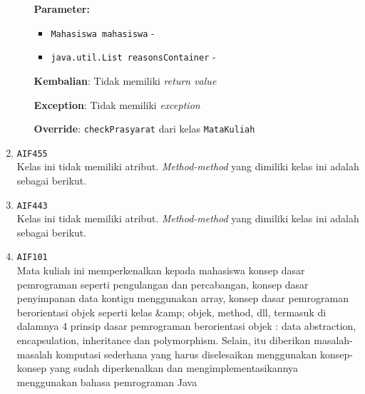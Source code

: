 \documentclass{article}
\begin{document}
\begin{enumerate}
\begin{itemize}
\textbf{Parameter:}\begin{itemize}
\item \texttt{Mahasiswa mahasiswa} - 
\item \texttt{java.util.List reasonsContainer} - 
\end{itemize}
\textbf{Kembalian}: Tidak memiliki \textit{return value}

\textbf{Exception}: Tidak memiliki \textit{exception}

\textbf{Override}: \texttt{checkPrasyarat} dari kelas \texttt{MataKuliah}

\end{itemize}
\item \texttt{AIF455}\\ 
Kelas ini tidak memiliki atribut. \textit{Method-method} yang dimiliki kelas ini adalah sebagai berikut.
\begin{itemize}
\end{itemize}
\item \texttt{AIF443}\\ 
Kelas ini tidak memiliki atribut. \textit{Method-method} yang dimiliki kelas ini adalah sebagai berikut.
\begin{itemize}
\end{itemize}
\item \texttt{AIF101}\\ 
Mata kuliah ini memperkenalkan kepada mahasiswa konsep dasar pemrograman 
 seperti pengulangan dan percabangan, konsep dasar penyimpanan data kontigu 
 menggunakan array, konsep dasar pemrograman berorientasi objek seperti kelas 
 &amp; objek, method, dll, termasuk di dalamnya 4 prinsip dasar pemrograman 
 berorientasi objek : data abstraction, encapsulation, inheritance dan 
 polymorphism. Selain, itu diberikan masalah-masalah komputasi sederhana 
 yang harus diselesaikan menggunakan konsep-konsep yang  sudah diperkenalkan 
 dan mengimplementasikannya menggunakan bahasa pemrograman Java


\end{enumerate}
\end{document}
